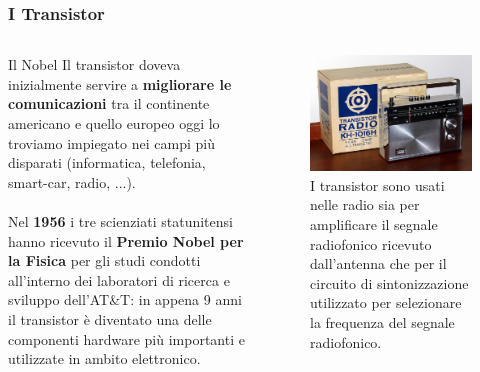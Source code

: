 \begin{frame}
	\frametitle{I Transistor}
	
	\begin{columns}			
		\begin{block}{Il Nobel}
			Il transistor doveva inizialmente servire a \textbf{migliorare le comunicazioni} tra il continente americano e quello europeo oggi lo troviamo impiegato nei campi più disparati (informatica, telefonia, smart-car, radio, ...).\\~\\
			Nel \textbf{1956} i tre scienziati statunitensi hanno ricevuto il \textbf{Premio Nobel per la Fisica} per gli studi condotti all'interno dei laboratori di ricerca e sviluppo dell'AT\&T: in appena 9 anni il transistor è diventato una delle componenti hardware più importanti e utilizzate in ambito elettronico.
		\end{block}
		
		\begin{figure}[!htbp]
			\centering 
			\includegraphics[width=0.95\linewidth]{images/2_le_architetture/radio_transistors.jpeg}
			\caption{I transistor sono usati nelle radio sia per amplificare il segnale radiofonico   ricevuto dall'antenna che per il circuito di sintonizzazione utilizzato per selezionare la frequenza del segnale radiofonico.}
		\end{figure}		
	\end{columns}
	
\end{frame}



